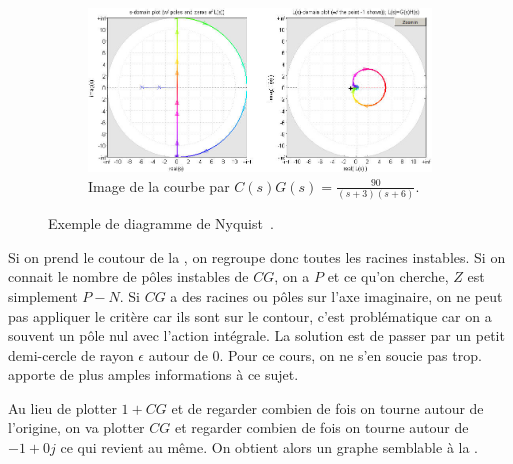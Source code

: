 \begin{figure}
\begin{subfigure}{0.49\linewidth}
    \includegraphics[trim=22cm 0cm 0cm 0cm,clip,width=\linewidth,height=\linewidth]{nyquistplot.jpg}
    \caption{Image de la courbe par $C(s)G(s)=\frac{90}{(s+3)(s+6)}$.}
    \label{fig:nyquistplot}
  \end{subfigure}
  \caption{Exemple de diagramme de Nyquist~\cite{cheever2013nyquist}.}
  \label{fig:nyquist}
\end{figure}

Si on prend le coutour de la ,
on regroupe donc toutes les racines instables.
Si on connait le nombre de pôles instables de $CG$, on a $P$ et ce qu'on cherche,
$Z$ est simplement $P - N$.
Si $CG$ a des racines ou pôles sur l'axe imaginaire, on ne peut pas appliquer le
critère car ils sont sur le contour, c'est problématique car on a souvent un
pôle nul avec l'action intégrale.
La solution est de passer par un petit demi-cercle de rayon $\epsilon$ autour
de 0.
Pour ce cours, on ne s'en soucie pas trop.
\cite{cheever2013nyquist} apporte de plus amples informations à ce sujet.

Au lieu de plotter $1 + CG$ et de regarder combien de fois on tourne autour
de l'origine,
on va plotter $CG$ et regarder combien de fois on tourne autour de $-1 + 0j$
ce qui revient au même.
On obtient alors un graphe semblable à la .

